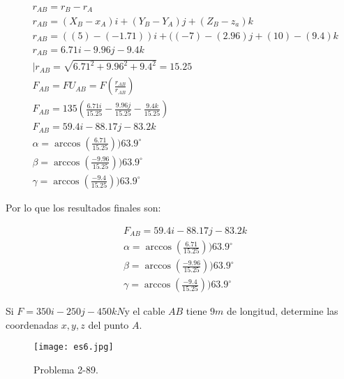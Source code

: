 \begin{align*}
	 & r_{AB}=r_B-r_A                                                                     \\
	 & r_{AB}=(X_B-x_A)i+(Y_B-Y_A)j+(Z_B-z_a)k                                            \\
	 & r_{AB}=((5)-(-1.71))i+((-7)-(2.96)j+(10)-(9.4)k                                    \\
	 & r_{AB}=6.71i-9.96j-9.4k                                                            \\
	 & \mid r_{AB}=\sqrt{6.71^2+9.96^2+9.4^2}=15.25                                       \\
	 & F_{AB}=FU_{AB}=F\left(\frac{r_{AB}}{r_{AB}} \right)                                \\
	 & F_{AB}=135\left(\frac{6.71i}{15.25}-\frac{9.96j}{15.25}-\frac{9.4k}{15.25} \right) \\
	 & F_{AB}=59.4i-88.17j-83.2k                                                          \\
	 & \alpha=\arccos\left(\frac{6.71}{15.25} \right))63.9^{\circ}                        \\
	 & \beta=\arccos\left(\frac{-9.96}{15.25} \right))63.9^{\circ}                        \\
	 & \gamma=\arccos\left(\frac{-9.4}{15.25} \right))63.9^{\circ}
\end{align*}

Por lo que los resultados finales son:

\begin{align*}
	 & F_{AB}=59.4i-88.17j-83.2k                                   \\
	 & \alpha=\arccos\left(\frac{6.71}{15.25} \right))63.9^{\circ} \\
	 & \beta=\arccos\left(\frac{-9.96}{15.25} \right))63.9^{\circ} \\
	 & \gamma=\arccos\left(\frac{-9.4}{15.25} \right))63.9^{\circ}
\end{align*}


\begin{problem}
Si $F=350i - 250j - 450k N $y el cable $AB$ tiene $9m$ de longitud, determine las coordenadas $x, y, z$ del punto $A$.
\end{problem}

\begin{figure}[h!]
	\centering
	\texttt{[image: es6.jpg]}
	\caption{Problema 2-89.}
	\label{es6pdf}
\end{figure}

